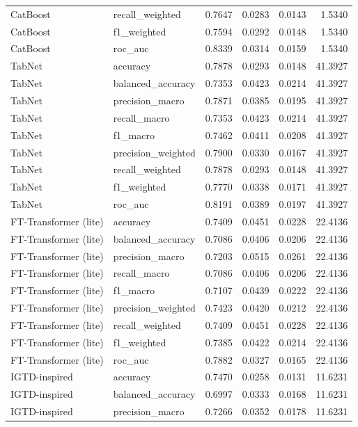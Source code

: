 \begin{tabular}{llrrrr}
CatBoost & recall_weighted & 0.7647 & 0.0283 & 0.0143 & 1.5340 \\
CatBoost & f1_weighted & 0.7594 & 0.0292 & 0.0148 & 1.5340 \\
CatBoost & roc_auc & 0.8339 & 0.0314 & 0.0159 & 1.5340 \\
TabNet & accuracy & 0.7878 & 0.0293 & 0.0148 & 41.3927 \\
TabNet & balanced_accuracy & 0.7353 & 0.0423 & 0.0214 & 41.3927 \\
TabNet & precision_macro & 0.7871 & 0.0385 & 0.0195 & 41.3927 \\
TabNet & recall_macro & 0.7353 & 0.0423 & 0.0214 & 41.3927 \\
TabNet & f1_macro & 0.7462 & 0.0411 & 0.0208 & 41.3927 \\
TabNet & precision_weighted & 0.7900 & 0.0330 & 0.0167 & 41.3927 \\
TabNet & recall_weighted & 0.7878 & 0.0293 & 0.0148 & 41.3927 \\
TabNet & f1_weighted & 0.7770 & 0.0338 & 0.0171 & 41.3927 \\
TabNet & roc_auc & 0.8191 & 0.0389 & 0.0197 & 41.3927 \\
FT-Transformer (lite) & accuracy & 0.7409 & 0.0451 & 0.0228 & 22.4136 \\
FT-Transformer (lite) & balanced_accuracy & 0.7086 & 0.0406 & 0.0206 & 22.4136 \\
FT-Transformer (lite) & precision_macro & 0.7203 & 0.0515 & 0.0261 & 22.4136 \\
FT-Transformer (lite) & recall_macro & 0.7086 & 0.0406 & 0.0206 & 22.4136 \\
FT-Transformer (lite) & f1_macro & 0.7107 & 0.0439 & 0.0222 & 22.4136 \\
FT-Transformer (lite) & precision_weighted & 0.7423 & 0.0420 & 0.0212 & 22.4136 \\
FT-Transformer (lite) & recall_weighted & 0.7409 & 0.0451 & 0.0228 & 22.4136 \\
FT-Transformer (lite) & f1_weighted & 0.7385 & 0.0422 & 0.0214 & 22.4136 \\
FT-Transformer (lite) & roc_auc & 0.7882 & 0.0327 & 0.0165 & 22.4136 \\
IGTD-inspired & accuracy & 0.7470 & 0.0258 & 0.0131 & 11.6231 \\
IGTD-inspired & balanced_accuracy & 0.6997 & 0.0333 & 0.0168 & 11.6231 \\
IGTD-inspired & precision_macro & 0.7266 & 0.0352 & 0.0178 & 11.6231 \\

\end{tabular}
